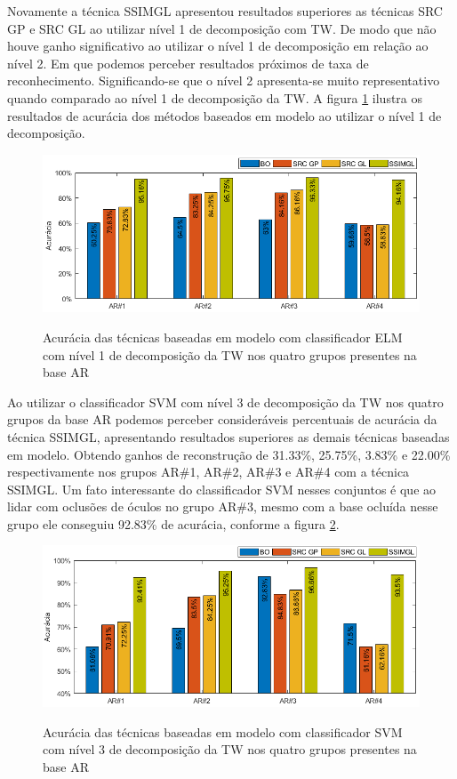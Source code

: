 Novamente a técnica SSIMGL apresentou resultados superiores as técnicas SRC GP e SRC GL ao utilizar nível 1 de decomposição com TW. De modo que não houve ganho significativo ao utilizar o nível 1 de decomposição em relação ao nível 2. Em que podemos perceber resultados próximos de taxa de reconhecimento. Significando-se que o nível 2 apresenta-se muito representativo quando comparado ao nível 1 de decomposição da TW. A figura \ref{fig:acuracia_modelo_ELM_nivel1} ilustra os resultados de acurácia dos métodos baseados em modelo ao utilizar o nível 1 de decomposição.


\begin{figure}[H]
\centering
\caption{Acurácia das técnicas baseadas em modelo com classificador ELM com nível 1 de decomposição da TW nos quatro grupos presentes na base AR}
\includegraphics[scale=0.52]{imgs4/acuracia/nivel_one_two/ELM_nivel1_modelo}
\label{fig:acuracia_modelo_ELM_nivel1}
\end{figure}


Ao utilizar o classificador SVM com nível 3 de decomposição da TW nos quatro grupos da base AR podemos perceber consideráveis percentuais de acurácia da técnica SSIMGL, apresentando resultados superiores as demais técnicas baseadas em modelo. Obtendo ganhos de reconstrução de 31.33\%, 25.75\%, 3.83\% e 22.00\% respectivamente nos grupos AR\#1, AR\#2, AR\#3 e AR\#4 com a técnica SSIMGL. Um fato interessante do classificador SVM nesses conjuntos é que ao lidar com oclusões de óculos no grupo AR\#3, mesmo com a base ocluída nesse grupo ele conseguiu 92.83\% de acurácia, conforme a figura \ref{fig:acuracia_modelo_SVM}. 

\begin{figure}[H]
\centering
\caption{Acurácia das técnicas baseadas em modelo com classificador SVM com nível 3 de decomposição da TW nos quatro grupos presentes na base AR}
\includegraphics[scale=0.52]{imgs4/acuracia_modelo_SVM}
\label{fig:acuracia_modelo_SVM}
\end{figure}



